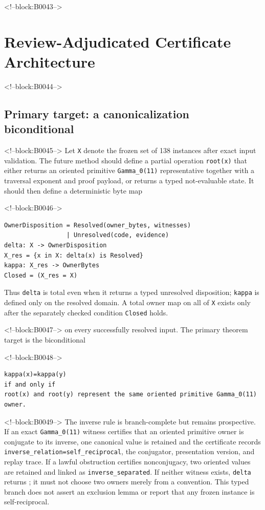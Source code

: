 \documentclass[11pt]{article}
\begin{document}
<!--block:B0043-->
\hypertarget{4-review-adjudicated-certificate-architecture}{%
\section{Review-Adjudicated Certificate
Architecture}\label{4-review-adjudicated-certificate-architecture}}

<!--block:B0044-->
\hypertarget{41-primary-target-a-canonicalization-biconditional}{%
\subsection{Primary target: a canonicalization
biconditional}\label{41-primary-target-a-canonicalization-biconditional}}

<!--block:B0045-->
Let \texttt{X} denote the frozen set of 138 instances after exact input
validation. The future method should define a partial operation
\texttt{root(x)} that either returns an oriented primitive
\texttt{Gamma\_0(11)} representative together with a traversal exponent
and proof payload, or returns a typed not-evaluable state. It should
then define a deterministic byte map

<!--block:B0046-->
\begin{verbatim}
OwnerDisposition = Resolved(owner_bytes, witnesses)
                 | Unresolved(code, evidence)
delta: X -> OwnerDisposition
X_res = {x in X: delta(x) is Resolved}
kappa: X_res -> OwnerBytes
Closed = (X_res = X)
\end{verbatim}
Thus \texttt{delta} is total even when it returns a typed unresolved disposition;
\texttt{kappa} is defined only on the resolved domain.  A total owner map on all
of \texttt{X} exists only after the separately checked condition
\texttt{Closed} holds.

<!--block:B0047-->
on every successfully resolved input. The primary theorem target is the
biconditional

<!--block:B0048-->
\begin{verbatim}
kappa(x)=kappa(y)
if and only if
root(x) and root(y) represent the same oriented primitive Gamma_0(11) owner.
\end{verbatim}

<!--block:B0049-->
The inverse rule is branch-complete but remains prospective.  If an exact
\texttt{Gamma\_0(11)} witness certifies that an oriented primitive owner is
conjugate to its inverse, one canonical value is retained and the certificate
records \texttt{inverse\_relation=self\_reciprocal}, the conjugator, presentation
version, and replay trace.  If a lawful obstruction certifies nonconjugacy, two
oriented values are retained and linked as \texttt{inverse\_separated}.  If
neither witness exists, \texttt{delta} returns
; it must not choose two owners merely from a
convention.  This typed branch does not assert an exclusion lemma or report that
any frozen instance is self-reciprocal.
\end{document}
